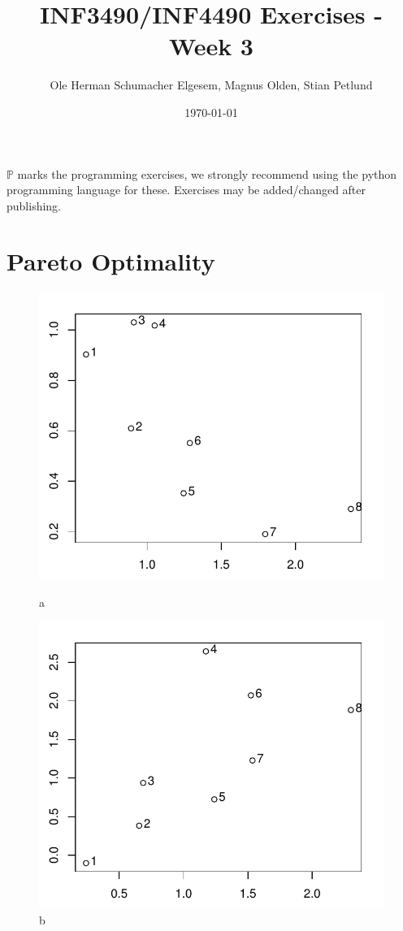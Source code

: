 \documentclass{article}           %
\title{\vspace{-2cm}INF3490/INF4490 Exercises - Week 3}
\author{Ole Herman Schumacher Elgesem, Magnus Olden, Stian Petlund}
\date{\today}
\newcommand\marginsymbol[1][0pt]{%
  \tabto*{0cm}\makebox[\dimexpr-1cm-#1\relax][r]{$\mathbb{P}$}\tabto*{\TabPrevPos}}
\begin{document}
    \renewcommand\marginsymbol[1][0pt]{%
  \tabto*{0cm}\makebox[-1cm][c]{$\mathbb{P}$}\tabto*{\TabPrevPos}}

\maketitle
\(\mathbb{P}\) marks the programming exercises, we strongly recommend using
the python programming language for these. Exercises may be added/changed
after publishing.

\section{Pareto Optimality}
\begin{figure}[H]
  \centering
  \begin{minipage}[b]{0.45\textwidth}
    \includegraphics[width=\textwidth]{front_points_1.pdf}
    \caption{a}
  \end{minipage}
  \hfill
  \begin{minipage}[b]{0.45\textwidth}
    \includegraphics[width=\textwidth]{front_points_2.pdf}
    \caption{b}
  \end{minipage}
\end{figure}
\end{document}
